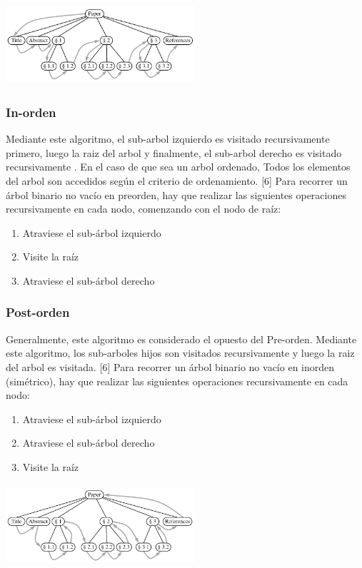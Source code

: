 \documentclass[twoside,twocolumn]{article}
\begin{document}
\includegraphics[width=7cm, height=3cm]{img/Screenshot_2.png}

\subsubsection{In-orden}

Mediante este algoritmo, el sub-arbol izquierdo es visitado recursivamente primero, luego la raiz del arbol y finalmente, el sub-arbol derecho es visitado recursivamente . En el caso de que sea un arbol ordenado, Todos los elementos del arbol son accedidos según el criterio de ordenamiento. [6]
Para recorrer un árbol binario no vacío en preorden, hay que realizar las siguientes operaciones recursivamente en cada nodo, comenzando con el nodo de raíz:

\begin{enumerate}
  \item Atraviese el sub-árbol izquierdo
  \item Visite la raíz
  \item Atraviese el sub-árbol derecho
\end{enumerate}

\subsubsection{Post-orden}

Generalmente, este algoritmo es considerado el opuesto del Pre-orden. Mediante este algoritmo, los sub-arboles hijos son visitados recursivamente y luego la raiz del arbol es visitada. [6]
Para recorrer un árbol binario no vacío en inorden (simétrico), hay que realizar las siguientes operaciones recursivamente en cada nodo:

\begin{enumerate}
  \item Atraviese el sub-árbol izquierdo
  \item Atraviese el sub-árbol derecho
  \item Visite la raíz
\end{enumerate}

\includegraphics[width=7cm, height=3cm]{img/Screenshot_3.png}
\end{document}
